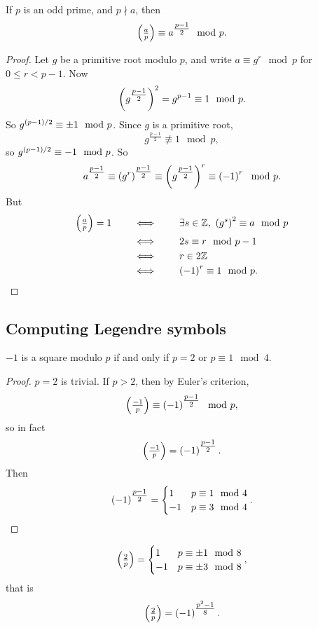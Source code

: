 \begin{theorem}
If $ p $ is an odd prime, and $ p \nmid a $, then
$$ \jacobi{a}{p} \equiv a^{\tfrac{p - 1}{2}} \mod p. $$
\end{theorem}

\begin{proof}
Let $ g $ be a primitive root modulo $ p $, and write $ a \equiv g^r \mod p $ for $ 0 \le r < p - 1 $. Now
$$ \br{g^{\tfrac{p - 1}{2}}}^2 = g^{p - 1} \equiv 1 \mod p. $$
So $ g^{\br{p - 1} / 2} \equiv \pm 1 \mod p $. Since $ g $ is a primitive root,
$$ g^{\tfrac{p - 1}{2}} \not\equiv 1 \mod p, $$
so $ g^{\br{p - 1} / 2} \equiv -1 \mod p $. So
$$ a^{\tfrac{p - 1}{2}} \equiv \br{g^r}^{\tfrac{p - 1}{2}} \equiv \br{g^{\tfrac{p - 1}{2}}}^r \equiv \br{-1}^r \mod p. $$
But
\begin{align*}
\jacobi{a}{p} = 1 \qquad
& \iff \qquad \exists s \in \Z, \ \br{g^s}^2 \equiv a \mod p \\
& \iff \qquad 2s \equiv r \mod p - 1 \\
& \iff \qquad r \in 2\Z \\
& \iff \qquad \br{-1}^r \equiv 1 \mod p.
\end{align*}
\end{proof}

\subsection{Computing Legendre symbols}

\begin{proposition}
$ -1 $ is a square modulo $ p $ if and only if $ p = 2 $ or $ p \equiv 1 \mod 4 $.
\end{proposition}

\begin{proof}
$ p = 2 $ is trivial. If $ p > 2 $, then by Euler's criterion,
$$ \jacobi{-1}{p} \equiv \br{-1}^{\tfrac{p - 1}{2}} \mod p, $$
so in fact
$$ \jacobi{-1}{p} = \br{-1}^{\tfrac{p - 1}{2}}. $$
Then
$$ \br{-1}^{\tfrac{p - 1}{2}} =
\begin{cases}
1 & p \equiv 1 \mod 4 \\
-1 & p \equiv 3 \mod 4
\end{cases}.
$$
\end{proof}

\pagebreak

\begin{proposition}
$$ \jacobi{2}{p} =
\begin{cases}
1 & p \equiv \pm 1 \mod 8 \\
-1 & p \equiv \pm 3 \mod 8
\end{cases},
$$
that is
$$ \jacobi{2}{p} = \br{-1}^{\tfrac{p^2 - 1}{8}}. $$
\end{proposition}

